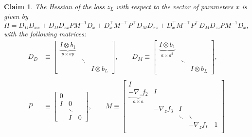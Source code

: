 \documentclass{article}
\newtheorem{claim}{Claim}
\begin{document}
\begin{claim}
  The Hessian of the loss $z_L$ with respect to the vector of parameters $x$ is given by
  \begin{equation}
    \label{eq:hessian}
    H = D_DD_{xx}  + D_DD_{zx} PM^{-1} D_x + D_x^\top M^{-\top}P^\top D_M D_{xz}+D_x^\top M^{-\top}P^\top D_M D_{zz}P M^{-1}D_x,
  \end{equation}
  with the following matrices:
  \begin{align*}
    D_D    & \equiv
    \begin{bmatrix}
      \underbrace{I \otimes b_1}_{p \times ap} &        &               \\
                                               & \ddots &               \\
                                               &        & I \otimes b_L
    \end{bmatrix}
    ,
    \qquad
    D_M \equiv
    \begin{bmatrix}
      \underbrace{I \otimes b_1}_{a \times a^2} &        &               \\
                                                & \ddots &               \\
                                                &        & I \otimes b_L
    \end{bmatrix}
    ,               \\                                                                                     \\
    P      & \equiv
    \begin{bmatrix}
      0 \\ I & 0 \\ &\ddots \\ &I&0
    \end{bmatrix}
    ,    \qquad
    M       \equiv
    \begin{bmatrix}
      I                                                                                    \\
      \underbrace{-\nabla_z f_2}_{a \times a} & I                                          \\
                                              & -\nabla_z f_3 & I                          \\
                                              &               & \ddots & \ddots            \\
                                              &               &        & -\nabla_z f_L & 1 \\

\end{bmatrix}
\end{align*}
\end{claim}
\end{document}
